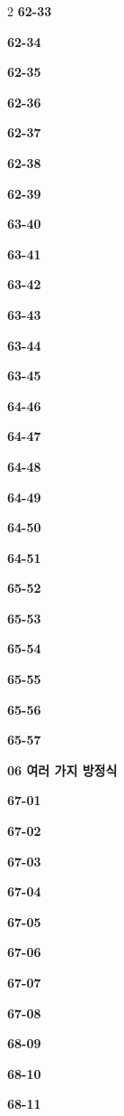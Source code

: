 \documentclass[10pt,a4paper]{article}
\begin{document}
\begin{multicols}{2}
\noindent\textbf{62-33}\ \par
\noindent\textbf{62-34}\ \par
\noindent\textbf{62-35}\ \par
\noindent\textbf{62-36}\ \par
\noindent\textbf{62-37}\ \par
\noindent\textbf{62-38}\ \par
\noindent\textbf{62-39}\ \par
\noindent\textbf{63-40}\ \par
\noindent\textbf{63-41}\ \par
\noindent\textbf{63-42}\ \par
\noindent\textbf{63-43}\ \par
\noindent\textbf{63-44}\ \par
\noindent\textbf{63-45}\ \par
\noindent\textbf{64-46}\ \par
\noindent\textbf{64-47}\ \par
\noindent\textbf{64-48}\ \par
\noindent\textbf{64-49}\ \par
\noindent\textbf{64-50}\ \par
\noindent\textbf{64-51}\ \par
\noindent\textbf{65-52}\ \par
\noindent\textbf{65-53}\ \par
\noindent\textbf{65-54}\ \par
\noindent\textbf{65-55}\ \par
\noindent\textbf{65-56}\ \par
\noindent\textbf{65-57}\ \par
\noindent\textbf{06 여러 가지 방정식}\par\smallskip
\noindent\textbf{67-01}\ \par
\noindent\textbf{67-02}\ \par
\noindent\textbf{67-03}\ \par
\noindent\textbf{67-04}\ \par
\noindent\textbf{67-05}\ \par
\noindent\textbf{67-06}\ \par
\noindent\textbf{67-07}\ \par
\noindent\textbf{67-08}\ \par
\noindent\textbf{68-09}\ \par
\noindent\textbf{68-10}\ \par
\noindent\textbf{68-11}\ \par

\end{multicols}
\end{document}
